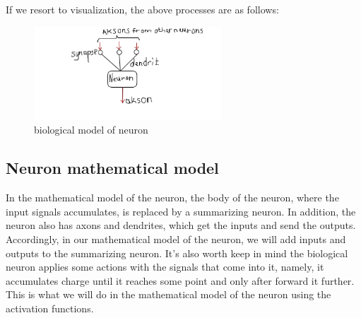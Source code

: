 If we resort to visualization, the above processes are as follows:
\begin{figure}[h]
    \centering \includegraphics[width=7cm]{images/neuron_biological_model.png}
    \caption {biological model of neuron}
\end{figure}    

\subsection{Neuron mathematical model}
In the mathematical model of the neuron, the body of the neuron, where the input signals accumulates, is replaced by a summarizing neuron. In addition, the neuron also has axons and dendrites, which get the inputs and send the outputs. Accordingly, in our mathematical model of the neuron, we will add inputs and outputs to the summarizing neuron. It's also worth keep in mind the biological neuron applies some actions with the signals that come into it, namely, it accumulates charge until it reaches some point and only after forward it further. This is what we will do in the mathematical model of the neuron using the activation functions. 


